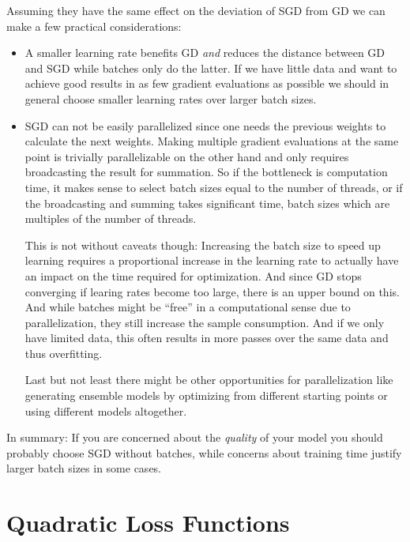 Assuming they have the same effect on the deviation of SGD from GD we can
make a few practical considerations:
\begin{itemize}
	\item A smaller learning rate benefits GD \emph{and} reduces the distance
	between GD and SGD while batches only do the latter. If we have little data
	and want to achieve good results in as few gradient evaluations as possible
	we should in general choose smaller learning rates over larger batch sizes.
	\item SGD can not be easily parallelized since one needs the previous weights
	to calculate the next weights. Making multiple gradient evaluations at
	the same point is trivially parallelizable on the other hand and only
	requires broadcasting the result for summation. So if the bottleneck is
	computation time, it makes sense to select batch sizes equal to the number of
	threads, or if the broadcasting and summing takes significant time, batch
	sizes which are multiples of the number of threads.

	This is not without caveats though: Increasing the batch size to speed up
	learning requires a proportional increase in the learning rate to actually
	have an impact on the time required for optimization. And since GD stops
	converging if learing rates become too large, there is an upper bound on this.
	And while batches might be ``free'' in a computational sense due to
	parallelization, they still increase the sample consumption. And if we only
	have limited data, this often results in more passes over the same data and
	thus overfitting.
	
	Last but not least there might be other opportunities for parallelization
	like generating ensemble models by optimizing from different starting points
	or using different models altogether.
\end{itemize}
In summary: If you are concerned about the \emph{quality} of your model you should
probably choose SGD without batches, while concerns about training time justify
larger batch sizes in some cases.


\section{Quadratic Loss Functions}

